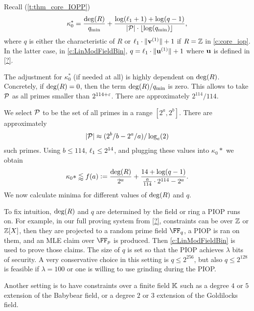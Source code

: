 \documentclass[11pt,letterpaper,usenames,dvipsnames]{article}
\begin{document}
Recall (\cref{t:thm_core_IOPP})
    $$
    \kappa_0^* = \frac{\deg(R)}{q_{\min}} + \frac{\log(\ell_1 +1) + \log(q-1)}{|\mathcal{P}|\cdot \lfloor\log(q_{\min})\rfloor},
      $$
    where $q$ is either the characteristic of $R$ or $\ell_1 \cdot \lVert \mathbf{v}^{(1)}\rVert +1$ if $R=\mathbb{Z}$ in \cref{c:core_iop}. In the latter case, in \cref{c:LinModFieldBin},  $q=\ell_1 \cdot \lVert \mathbf{u}^{(1)}\rVert +1$  where $\mathbf{u}$ is defined in \cref{?}. 

    The adjustment for $\kappa_0^*$ (if needed at all) is highly dependent on $\deg(R)$. Concretely, if $\deg(R)=0$, then the term $\deg(R)/q_{\min}$ is zero. This allows to take $\mathcal{P}$ as all primes smaller than $2^{114+\varepsilon}$. There are approximately $2^{114}/114$.

    We select $\mathcal{P}$ to be the set of all primes in a range $[2^a, 2^b]$. There are approximately  $$|\mathcal{P}|\approx (2^b/b - 2^a/a)/\log_e(2)$$ such primes.  Using $b\leq 114$,  $\ell_1\leq 2^{14}$, and plugging these values into $\kappa_0*$ we obtain
     $$
    \kappa_0*\lessapprox f(a){\;\vcentcolon=\;} \frac{\deg(R)}{2^a} + \frac{14 + \log(q-1)}{\frac{a}{114}\cdot 2^{114} - 2^a}.
    $$
    We now calculate  minima for different values of $\deg(R)$ and $q$.  

    To fix intuition, $\deg(R)$ and $q$ are determined by the field or ring a PIOP runs on. For example, in our full proving system from \cref{?}, constraints can be over $\mathbb{Z}$ or $\mathbb{Z}[X]$, then they are projected to a random prime field $\FF_q$, a PIOP is ran on them, and an MLE claim over $\FF_p$ is produced. Then \cref{c:LinModFieldBin} is used to prove those claims. The size of $q$ is set so that the PIOP achieves $\lambda$ bits of security. A very conservative choice in this setting is $q\leq 2^{256}$, but also $q\leq 2^{128}$ is feasible if $\lambda=100$ or one is willing to use grinding during the PIOP. 

    Another setting is to have constraints over a finite field $\mathbb{K}$ such as a degree $4$ or $5$ extension of the Babybear field, or a degree $2$ or $3$ extension of the Goldilocks field. 
\end{document}
